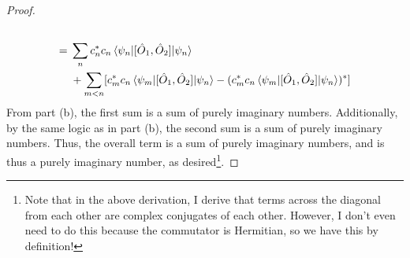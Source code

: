 \documentclass[../psets.tex]{subfiles}
\begin{document}
\begin{enumerate}
\begin{enumerate}
\begin{proof}
\begin{align*}
\begin{split}
                \end{split}\\
                \begin{split}
                    ={}& \sum_nc_n^*c_n\ev{[\hat{O}_1,\hat{O}_2]}{\psi_n}\\
                    &+\sum_{m<n}[c_m^*c_n\mel{\psi_m}{[\hat{O}_1,\hat{O}_2]}{\psi_n}-(c_m^*c_n\mel{\psi_m}{[\hat{O}_1,\hat{O}_2]}{\psi_n})^*]
                \end{split}
            \end{align*}
            From part (b), the first sum is a sum of purely imaginary numbers. Additionally, by the same logic as in part (b), the second sum is a sum of purely imaginary numbers. Thus, the overall term is a sum of purely imaginary numbers, and is thus a purely imaginary number, as desired\footnote{Note that in the above derivation, I derive that terms across the diagonal from each other are complex conjugates of each other. However, I don't even need to do this because the commutator is Hermitian, so we have this by definition!}.
        \end{proof}
    \end{enumerate}
\end{enumerate}
\end{document}
